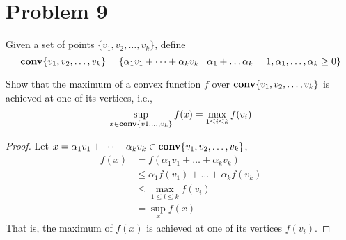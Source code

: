 \documentclass[11pt]{article}
\begin{document}
\clearpage
\section*{Problem 9}
Given a set of points $\{v_1, v_2, \dots, v_k\}$, define
\[
\mathop {\textbf{conv}}\{v_1, v_2, \dots, v_k\} = \{\alpha_1 v_1 + \dots + \alpha_k v_k\mid \alpha_1 + \dots \alpha_k = 1, \alpha_1, \dots, \alpha_k \geq 0\}
\]

Show that the maximum of a convex function $f$ over $\mathop {\textbf{conv}}\{v_1, v_2, \dots, v_k\}$ is achieved at one of its vertices, i.e.,
\[
\sup_{x\in\mathop {\textbf{conv}}\{v1, \dots, v_k\}} f(x) = \max_{1\leq i \leq k} f(v_i)
\]

\begin{proof}
  Let $x = \alpha_1 v_1 + \dots + \alpha_k v_k \in \mathop {\textbf{conv}}\{v_1, v_2, \dots, v_k\}$,
  \begin{align*}
    f(x) 
    &= f(\alpha_1 v_1 + \dots + \alpha_k v_k)\\
    &\leq \alpha_1 f(v_1) + \dots + \alpha_k f(v_k)\\
    &\leq \max_{1\leq i \leq k} f(v_i)\\
    &=\sup_x f(x)
  \end{align*}
  That is, the maximum of $f(x)$ is achieved at one of its vertices $f(v_i)$.
\end{proof}
\end{document}
